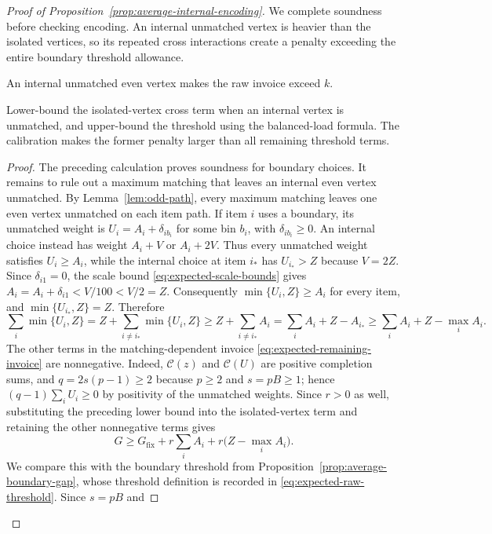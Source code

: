\begin{proof}[Proof of Proposition~\ref{prop:average-internal-encoding}]
We complete soundness before checking encoding. An internal unmatched
vertex is heavier than the isolated vertices, so its repeated cross
interactions create a penalty exceeding the entire boundary threshold
allowance.

\begin{claim}
\label{clm:average-internal-penalty}
An internal unmatched even vertex makes the raw invoice exceed $k$.
\end{claim}
\begin{proofstrategy}
Lower-bound the isolated-vertex cross term when an internal vertex is
unmatched, and upper-bound the threshold using the balanced-load
formula. The calibration makes the former penalty larger than all
remaining threshold terms.
\end{proofstrategy}
\begin{proof}
The preceding calculation proves soundness for boundary choices.
It remains to rule out a maximum matching that leaves an internal even
vertex unmatched. By Lemma~\ref{lem:odd-path}, every maximum matching
leaves one even vertex unmatched on each item path. If item $i$ uses a
boundary, its unmatched weight is $U_i=A_i+\delta_{ib_i}$ for some bin
$b_i$, with $\delta_{ib_i}\ge0$. An internal choice instead has weight
$A_i+V$ or $A_i+2V$. Thus every unmatched weight satisfies
$U_i\ge A_i$, while the internal choice at item $i_*$ has $U_{i_*}>Z$
because $V=2Z$. Since $\delta_{i1}=0$, the scale bound
\eqref{eq:expected-scale-bounds} gives
$A_i=A_i+\delta_{i1}<V/100<V/2=Z$. Consequently
$\min\{U_i,Z\}\ge A_i$ for every item, and
$\min\{U_{i_*},Z\}=Z$. Therefore
\[
 \sum_i\min\{U_i,Z\}
 =Z+\sum_{i\ne i_*}\min\{U_i,Z\}
 \ge Z+\sum_{i\ne i_*}A_i
 =\sum_iA_i+Z-A_{i_*}
 \ge\sum_iA_i+Z-\max_iA_i.
\]
The other terms in the matching-dependent invoice
\eqref{eq:expected-remaining-invoice} are nonnegative. Indeed,
$\mathcal C(z)$ and $\mathcal C(U)$ are positive completion sums, and
$q=2s(p-1)\ge2$ because $p\ge2$ and $s=pB\ge1$; hence
$(q-1)\sum_iU_i\ge0$ by positivity of the unmatched weights. Since
$r>0$ as well, substituting the preceding lower bound into the
isolated-vertex term and retaining the other nonnegative terms gives
\[
 G\ge G_{\mathrm{fix}}+r\sum_i A_i+
                   r\bigl(Z-\max_i A_i\bigr).
\]
We compare this with the boundary threshold from
Proposition~\ref{prop:average-boundary-gap}, whose threshold definition
is recorded in \eqref{eq:expected-raw-threshold}. Since $s=pB$ and

\end{proof}
\end{proof}
